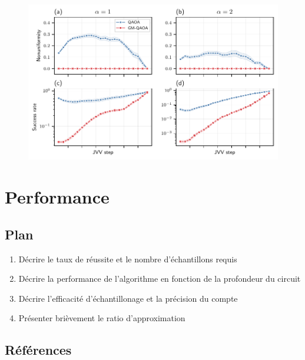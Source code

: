 \begin{figure}[h]
    \centering
    \includegraphics[width=1\textwidth]{figures/nae3sat-jvv-steps}
    \caption{}
    \label{fig:nae3sat-jvv-steps}
\end{figure}



\section{Performance}

\subsection*{Plan}

\begin{enumerate}
    \item  Décrire le taux de réussite et le nombre d'échantillons requis
    \item  Décrire la performance de l'algorithme en fonction de la profondeur du circuit
    \item Décrire l'efficacité d'échantillonage et la précision du compte
    \item Présenter brièvement le ratio d'approximation
\end{enumerate}

\subsection*{Références}

